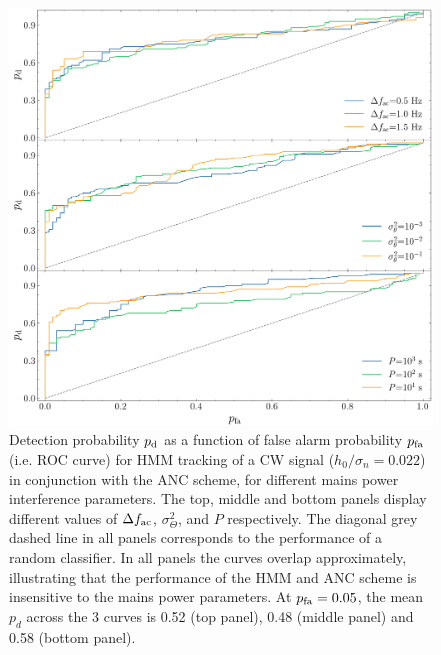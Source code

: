 \documentclass[pra,superscriptaddress,reprint,amsmath,amssymb,nofootinbib]{revtex4-2}
\begin{document}
\begin{figure}
	\begin{center}
		\includegraphics[width=\columnwidth]{images/roc_curve_mains_power_params}
	\end{center}
	\caption{Detection probability $p_{\rm d}$ as a function of false alarm probability $p_{\rm fa}$ (i.e. ROC curve) for HMM tracking of a CW signal ($h_0 / \sigma_n = 0.022$) in conjunction with the ANC scheme, for different mains power interference parameters. The top, middle and bottom panels display different values of $\Delta f_{\rm ac}$, $\sigma_{\Theta}^2$, and $P$ respectively. The diagonal grey dashed line in all panels corresponds to the performance of a random classifier. In all panels the curves overlap approximately, illustrating that the performance of the HMM and ANC scheme is insensitive to the mains power parameters. At $p_{\rm fa} = 0.05$, the mean $p_{d}$ across the 3 curves is 0.52 (top panel), 0.48 (middle panel) and 0.58 (bottom panel).}
	\label{fig:roc1}
\end{figure}
\end{document}
